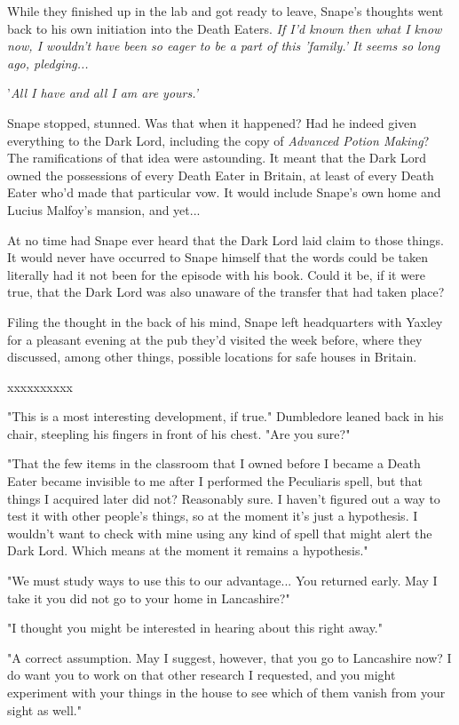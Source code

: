 \documentclass[a4paper,11pt]{article}
\begin{document}
While they finished up in the lab and got ready to leave, Snape's thoughts went back to his own initiation into the Death Eaters. \emph{If I'd known then what I know now, I wouldn't have been so eager to be a part of this 'family.' It seems so long ago, pledging...}

'\emph{All I have and all I am are yours.'}

Snape stopped, stunned. Was that when it happened? Had he indeed given everything to the Dark Lord, including the copy of \emph{Advanced Potion Making}? The ramifications of that idea were astounding. It meant that the Dark Lord owned the possessions of every Death Eater in Britain, at least of every Death Eater who'd made that particular vow. It would include Snape's own home and Lucius Malfoy's mansion, and yet...

At no time had Snape ever heard that the Dark Lord laid claim to those things. It would never have occurred to Snape himself that the words could be taken literally had it not been for the episode with his book. Could it be, if it were true, that the Dark Lord was also unaware of the transfer that had taken place?

Filing the thought in the back of his mind, Snape left headquarters with Yaxley for a pleasant evening at the pub they'd visited the week before, where they discussed, among other things, possible locations for safe houses in Britain.

xxxxxxxxxx

"This is a most interesting development, if true." Dumbledore leaned back in his chair, steepling his fingers in front of his chest. "Are you sure?"

"That the few items in the classroom that I owned before I became a Death Eater became invisible to me after I performed the Peculiaris spell, but that things I acquired later did not? Reasonably sure. I haven't figured out a way to test it with other people's things, so at the moment it's just a hypothesis. I wouldn't want to check with mine using any kind of spell that might alert the Dark Lord. Which means at the moment it remains a hypothesis."

"We must study ways to use this to our advantage... You returned early. May I take it you did not go to your home in Lancashire?"

"I thought you might be interested in hearing about this right away."

"A correct assumption. May I suggest, however, that you go to Lancashire now? I do want you to work on that other research I requested, and you might experiment with your things in the house to see which of them vanish from your sight as well."
\end{document}

